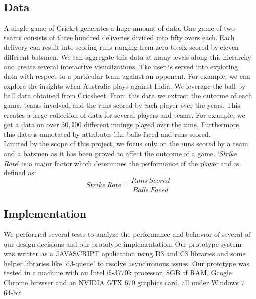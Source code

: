 \documentclass[10pt,journal,compsoc]{IEEEtran}
\begin{document}
\subsection {Data}
\indent A single game of Cricket generates a huge amount of data. One game of two teams consists of three hundred deliveries divided into fifty overs each. Each delivery can result into scoring runs ranging from zero to six scored by eleven different batsmen. We can aggregate this data at many levels along this hierarchy and create several interactive visualizations. The user is served into exploring data with respect to a particular team against an opponent. For example, we can explore the insights when Australia plays against India. We leverage the ball by ball data obtained from Cricsheet\cite{cricsheet}. From this data we extract the outcome of each game, teams involved, and the runs scored by each player over the years. This creates a large collection of data for several players and teams. For example, we get a data on over $30,000$ different innings played over the time. Furthermore, this data is annotated by attributes like balls faced and runs scored.\\

\indent Limited by the scope of this project, we focus only on the runs scored by a team and a batsmen as it has been proved to affect the outcome of a game. `\textit{Strike Rate}' is a major factor which determines the performance of the player and is defined as:
\begin{equation*}
Strike\ Rate = \frac{Runs\ Scored}{Balls\ Faced}
\end{equation*}

\subsection {Implementation}
We  performed  several  tests  to  analyze  the performance  and  behavior  of  several  of  our  design decisions   and   our   prototype   implementation.   Our
prototype  system  was  written  as  a  JAVASCRIPT application using D3\cite{d3} and C3\cite{c3} libraries and some helper libraries like `d3-queue'\cite{q} to resolve asynchronous issues.  Our prototype was tested in a  machine  with  an  Intel  i5-3770k  processor,  8GB  of RAM,  Google Chrome browser and  an  NVIDIA  GTX  670  graphics  card,  all under Windows 7 64-bit
\end{document}
